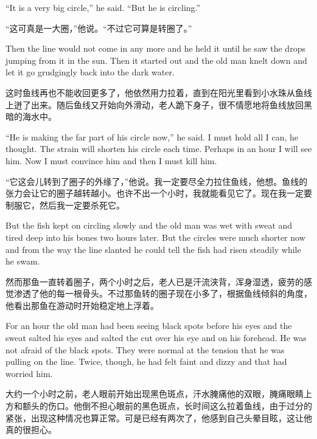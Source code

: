 \begin{paracol}{2}
\switchcolumn*

``It is a very big circle,'' he said. ``But he is circling.''

\switchcolumn

“这可真是一大圈，”他说。“不过它可算是转圈了。”

\switchcolumn*

Then the line would not come in any more and he held it until he saw the
drops jumping from it in the sun. Then it started out and the old man \gls{knelt}
down and let it go \gls{grudgingly} back into the dark water.

\switchcolumn

这时鱼线再也不能收回更多了，他依然用力拉着，直到在阳光里看到小水珠从鱼线上迸了出来。随后鱼线又开始向外滑动，老人跪下身子，很不情愿地将鱼线放回黑暗的海水中。

\switchcolumn*

``He is making the far part of his circle now,'' he said. I must hold all I
can, he thought. The strain will shorten his circle each time. Perhaps in an
hour I will see him. Now I must convince him and then I must kill him.

\switchcolumn

“它这会儿转到了圈子的外缘了，”他说。我一定要尽全力拉住鱼线，他想。鱼线的张力会让它的圈子越转越小。也许不出一个小时，我就能看见它了。现在我一定要制服它，然后我一定要杀死它。

\switchcolumn*

But the fish kept on circling slowly and the old man was wet with sweat and
tired deep into his bones two hours later. But the circles were much shorter
now and from the way the line slanted he could tell the fish had risen
steadily while he swam.

\switchcolumn

然而那鱼一直转着圈子，两个小时之后，老人已是汗流浃背，浑身湿透，疲劳的感觉渗透了他的每一根骨头。不过那鱼转的圈子现在小多了，根据鱼线倾斜的角度，他看出那鱼在游动时开始稳定地上浮着。

\switchcolumn*

For an hour the old man had been seeing black spots before his eyes and the
sweat salted his eyes and salted the cut over his eye and on his forehead.
He was not afraid of the black spots. They were normal at the tension that
he was pulling on the line. Twice, though, he had felt faint and \gls{dizzy}
and that had worried him.

\switchcolumn

大约一个小时之前，老人眼前开始出现黑色斑点，汗水腌痛他的双眼，腌痛眼睛上方和额头的伤口。他倒不担心眼前的黑色斑点，长时间这么拉着鱼线，由于过分的紧张，出现这种情况也算正常。可是已经有两次了，他感到自己头晕目眩，这让他真的很担心。


\end{paracol}

